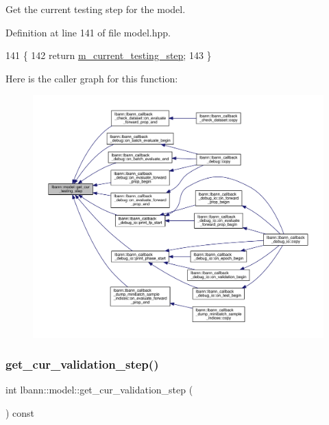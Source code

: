 Get the current testing step for the model. 

Definition at line 141 of file model.\+hpp.


\begin{DoxyCode}
141                                           \{
142     \textcolor{keywordflow}{return} \hyperlink{classlbann_1_1model_a2acf043862ba878cb7a91cb0d26c3791}{m\_current\_testing\_step};
143   \}
\end{DoxyCode}
Here is the caller graph for this function\+:\nopagebreak
\begin{figure}[H]
\begin{center}
\leavevmode
\includegraphics[width=350pt]{classlbann_1_1model_a4040b1f06a2a5d5187a72c06060124c1_icgraph}
\end{center}
\end{figure}
\mbox{\label{classlbann_1_1model_a680ef8ecf644dbc821b5e7488d3bd2c4}} 
\subsubsection{\texorpdfstring{get\+\_\+cur\+\_\+validation\+\_\+step()}{get\_cur\_validation\_step()}}
{\footnotesize\ttfamily int lbann\+::model\+::get\+\_\+cur\+\_\+validation\+\_\+step (\begin{DoxyParamCaption}{ }\end{DoxyParamCaption}) const\hspace{0.3cm}{\ttfamily [inline]}}

